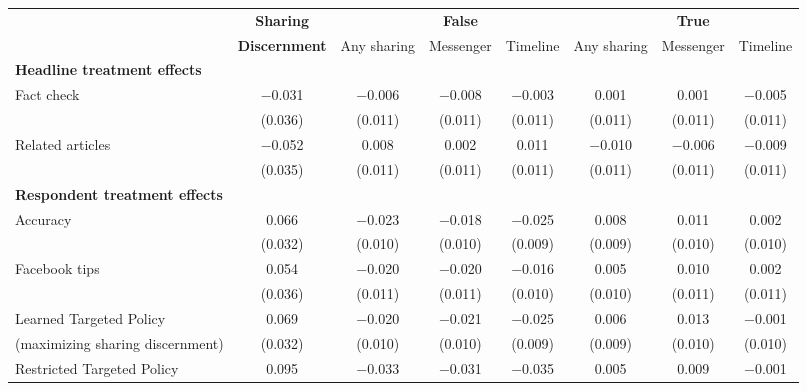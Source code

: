 
\begin{tabular}[t]{lccccccc}
 & \textbf{Sharing} &  & \textbf{False} &  &  & \textbf{True} & \\
 & \textbf{Discernment} & Any sharing & Messenger & Timeline & Any sharing & Messenger & Timeline\\\cmidrule(lr){2-2} \cmidrule(lr){3-5} \cmidrule(lr){6-8} \multicolumn{4}{l}{\textbf{Headline treatment effects}} \rule{0pt}{1.2\normalbaselineskip}\\
\hspace{1em}Fact check & \num{-0.031} & \num{-0.006} & \num{-0.008} & \num{-0.003} & \num{0.001} & \num{0.001} & \num{-0.005}\\
 & (\num{0.036}) & (\num{0.011}) & (\num{0.011}) & (\num{0.011}) & (\num{0.011}) & (\num{0.011}) & (\num{0.011})\\
\hspace{1em}Related articles & \num{-0.052} & \num{0.008} & \num{0.002} & \num{0.011} & \num{-0.010} & \num{-0.006} & \num{-0.009}\\
 & (\num{0.035}) & (\num{0.011}) & (\num{0.011}) & (\num{0.011}) & (\num{0.011}) & (\num{0.011}) & (\num{0.011})\\\multicolumn{4}{l}{\textbf{Respondent treatment effects}} \rule{0pt}{1.2\normalbaselineskip}\\
\hspace{1em}Accuracy & \num{0.066} & \num{-0.023} & \num{-0.018} & \num{-0.025} & \num{0.008} & \num{0.011} & \num{0.002}\\
 & (\num{0.032}) & (\num{0.010}) & (\num{0.010}) & (\num{0.009}) & (\num{0.009}) & (\num{0.010}) & (\num{0.010})\\
\hspace{1em}Facebook tips & \num{0.054} & \num{-0.020} & \num{-0.020} & \num{-0.016} & \num{0.005} & \num{0.010} & \num{0.002}\\
 & (\num{0.036}) & (\num{0.011}) & (\num{0.011}) & (\num{0.010}) & (\num{0.010}) & (\num{0.011}) & (\num{0.011})\\
\hspace{1em}Learned Targeted Policy & \num{0.069} & \num{-0.020} & \num{-0.021} & \num{-0.025} & \num{0.006} & \num{0.013} & \num{-0.001}\\
 \hspace{1.5em}(maximizing sharing discernment) & (\num{0.032}) & (\num{0.010}) & (\num{0.010}) & (\num{0.009}) & (\num{0.009}) & (\num{0.010}) & (\num{0.010})\\
\hspace{1em}Restricted Targeted Policy & \num{0.095} & \num{-0.033} & \num{-0.031} & \num{-0.035} & \num{0.005} & \num{0.009} & \num{-0.001}\\

\end{tabular}

